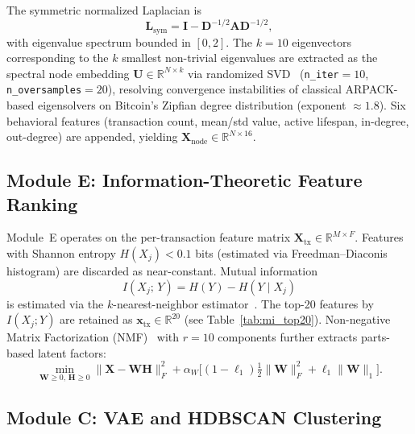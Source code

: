 \documentclass[journal]{IEEEtran}
\begin{document}
The symmetric normalized Laplacian is
\begin{equation}
  \mathbf{L}_{\mathrm{sym}}
    = \mathbf{I} - \mathbf{D}^{-1/2}\mathbf{A}\mathbf{D}^{-1/2},
  \label{eq:lsym_s}
\end{equation}
with eigenvalue spectrum bounded in $[0, 2]$.
The $k = 10$ eigenvectors corresponding to the $k$ smallest non-trivial
eigenvalues are extracted as the spectral node embedding
$\mathbf{U} \in \mathbb{R}^{N \times k}$ via randomized
SVD~\cite{Halko2011} (\texttt{n\_iter}$= 10$, \texttt{n\_oversamples}$= 20$),
resolving convergence instabilities of classical ARPACK-based eigensolvers on
Bitcoin's Zipfian degree distribution (exponent $\approx 1.8$).
Six behavioral features (transaction count, mean/std value, active lifespan,
in-degree, out-degree) are appended, yielding
$\mathbf{X}_{\mathrm{node}} \in \mathbb{R}^{N \times 16}$.

\subsection{Module E: Information-Theoretic Feature Ranking}
\label{sec:module_e}

Module~E operates on the per-transaction feature matrix
$\mathbf{X}_{\mathrm{tx}} \in \mathbb{R}^{M \times F}$.
Features with Shannon entropy $H(X_j) < 0.1$ bits (estimated via
Freedman--Diaconis histogram) are discarded as near-constant.
Mutual information
\begin{equation}
  I(X_j;\, Y) = H(Y) - H(Y \mid X_j)
  \label{eq:mi}
\end{equation}
is estimated via the $k$-nearest-neighbor estimator~\cite{Kraskov2004}.
The top-20 features by $I(X_j; Y)$ are retained as
$\mathbf{x}_{\mathrm{tx}} \in \mathbb{R}^{20}$ (see Table~\ref{tab:mi_top20}).
Non-negative Matrix Factorization (NMF)~\cite{Lee1999} with $r = 10$
components further extracts parts-based latent factors:
\begin{equation}
  \min_{\mathbf{W} \geq 0,\, \mathbf{H} \geq 0}
    \bigl\|\mathbf{X} - \mathbf{W}\mathbf{H}\bigr\|_F^2
    + \alpha_W \bigl[(1 - \ell_1)\tfrac{1}{2}\|\mathbf{W}\|_F^2
                    + \ell_1 \|\mathbf{W}\|_1\bigr].
  \label{eq:nmf}
\end{equation}

\subsection{Module C: VAE and HDBSCAN Clustering}
\label{sec:module_c}
\end{document}
